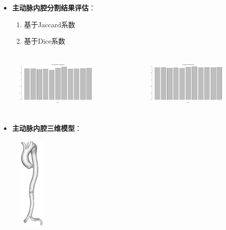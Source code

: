 \begin{frame}
\begin{itemize}
  \item \textbf{主动脉内腔分割结果评估}：
  \begin{enumerate}
    \item 基于Jaccard系数
    \item 基于Dice系数
  \end{enumerate}
\end{itemize}
\begin{columns}[b,onlytextwidth]
\begin{column}{.5\textwidth}
\begin{figure}[t]
\centering
\includegraphics[width=1.5in,height=1.0in]{../../Figures/gac/Jaccard.eps}
\end{figure}
\end{column}
\begin{column}{.5\textwidth}
\begin{figure}[t]
\centering
\includegraphics[width=1.5in,height=1.0in]{../../Figures/gac/Dice.eps}
\end{figure}
\end{column}
\end{columns}
\end{frame} 

\begin{frame}
\begin{itemize}
  \item \textbf{主动脉内腔三维模型}：
\end{itemize}
\begin{figure}[t]
\centering
\includegraphics[height=1.8in]{../../Figures/gac/model.eps}
\end{figure} 
\end{frame} 

\begin{frame}

\end{frame} 
